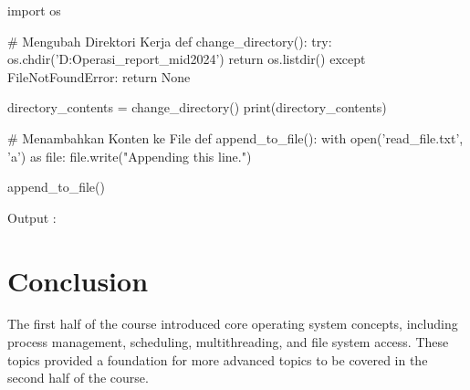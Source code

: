 \documentclass[12pt]{article}
\begin{document}
\begin{enumerate}
\begin{python}
import os

# Mengubah Direktori Kerja
def change_directory():
    try:
        os.chdir('D:\Kuliah{}\Sistem Operasi\os_report_mid2024')
        return os.listdir()
    except FileNotFoundError:
        return None

directory_contents = change_directory()
print(directory_contents)

# Menambahkan Konten ke File
def append_to_file():
    with open('read_file.txt', 'a') as file:
        file.write("Appending this line.\n")

append_to_file()
\end{python}
    \par Output : 
    \par ['.git', '.gitignore', 'a\_class', 'b\_class', 'README.md']
\end{enumerate}

\section{Conclusion}
The first half of the course introduced core operating system concepts, including process management, scheduling, multithreading, and file system access. These topics provided a foundation for more advanced topics to be covered in the second half of the course.
\end{document}

